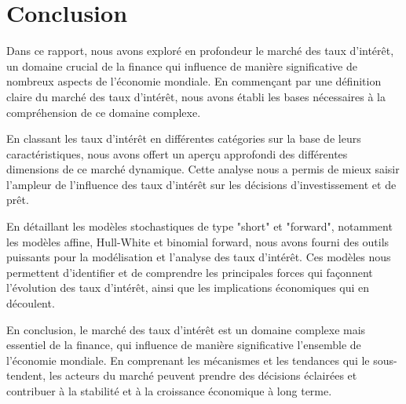 \chapter{Conclusion} %
 




Dans ce rapport, nous avons exploré en profondeur le marché des taux d'intérêt, un domaine crucial de la finance qui influence de manière significative de nombreux aspects de l'économie mondiale. En commençant par une définition claire du marché des taux d'intérêt,  nous avons établi les bases nécessaires à la compréhension de ce domaine complexe.

En classant les taux d'intérêt en différentes catégories sur la base de leurs caractéristiques, nous avons offert un aperçu approfondi des différentes dimensions de ce marché dynamique. Cette analyse nous a permis de mieux saisir l'ampleur de l'influence des taux d'intérêt sur les décisions d'investissement et de prêt.

En détaillant les modèles stochastiques de type "short" et "forward", notamment les modèles affine, Hull-White et binomial forward, nous avons fourni des outils puissants pour la modélisation et l'analyse des taux d'intérêt. Ces modèles nous permettent d'identifier et de comprendre les principales forces qui façonnent l'évolution des taux d'intérêt, ainsi que les implications économiques qui en découlent.

En conclusion, le marché des taux d'intérêt est un domaine complexe mais essentiel de la finance, qui influence de manière significative l'ensemble de l'économie mondiale. En comprenant les mécanismes et les tendances qui le sous-tendent, les acteurs du marché peuvent prendre des décisions éclairées et contribuer à la stabilité et à la croissance économique à long terme.
